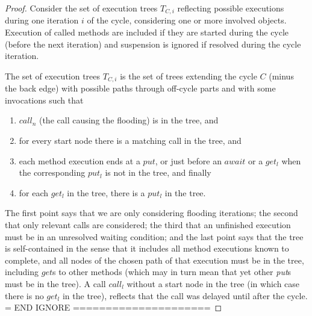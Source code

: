 {\begin{proof}
{ Consider the set of execution trees $T_{C,i}$ reflecting possible
 executions during one iteration $i$ of the cycle, considering one or
 more involved objects.  Execution of called methods are included if
 they are started during the cycle (before the next iteration) and
 suspension is ignored if resolved during the cycle iteration.
 \begin{definition}\label{def-tree}
  The set of execution trees $T_{C,i}$ is the set of trees extending
  the cycle $C$ (minus the back edge) with possible paths through
  off-cycle parts and with some  invocations such that
 \begin{enumerate}
  \item $call_n$ (the call causing the flooding) is in the tree, and 
  \item for every start node there is a matching call in the tree,    and  
  \item each method execution ends at a $put$, or just before an
   $await$ or a $get_l$ when the corresponding $put_l$ is not in the
   tree,
  and finally
  \item for each $get_l$ in the tree, there is a  $put_l$ in the tree.
 \end{enumerate}\end{definition}
 The first point says that we are only considering flooding iterations;
 the second that only relevant calls are considered; the third that an
 unfinished execution must be in an unresolved waiting condition; and
 the last point says that the tree is self-contained in the sense that
 it includes all method executions known to complete, and all nodes of
 the chosen path of that execution must be in the tree, including
 $get$s to other methods (which may in turn mean that yet other
 \emph{put}s must be in the tree).  A call $call_l$ without a start
 node in the tree (in which case there is no $get_l$ in the tree),
 reflects that the call was delayed until after the cycle.
 = END IGNORE =====================}


\end{proof}}
